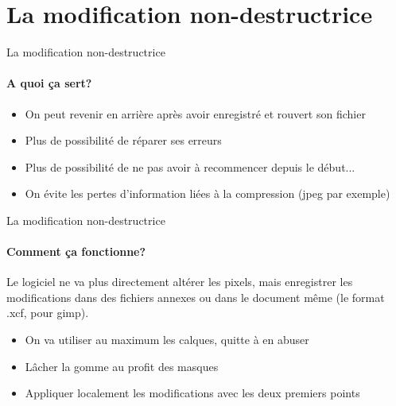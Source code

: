 \documentclass[10pt,svgnames,usenames,table]{beamer}
\begin{document}
\section{La modification non-destructrice}
	\begin{frame}{La modification non-destructrice}
	\framesubtitle{A quoi ça sert?}
	\begin{itemize}
		\item On peut revenir en arrière après avoir enregistré et rouvert son fichier
		\item Plus de possibilité de réparer ses erreurs
		\item Plus de possibilité de ne pas avoir à recommencer depuis le début...
		\item On évite les pertes d'information liées à la compression (jpeg par exemple)
	\end{itemize}		
	\end{frame}

	\begin{frame}{La modification non-destructrice}
	\framesubtitle{Comment ça fonctionne?}
	Le logiciel ne va plus directement altérer les pixels, mais enregistrer les modifications dans des fichiers annexes ou dans le document même (le format .xcf, pour gimp).
	\begin{itemize}
	\item On va utiliser au maximum les calques, quitte à en abuser
	\item Lâcher la gomme au profit des masques
	\item Appliquer localement les modifications avec les deux premiers points
	\end{itemize}		
	\end{frame}



\end{document}
